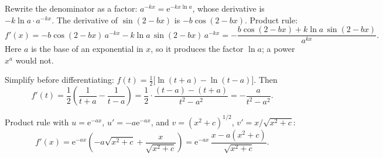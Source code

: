 \begin{solutions}
  \item Rewrite the denominator as a factor:
        $a^{-kx}=\mathrm{e}^{-kx\ln a}$, whose derivative is
        $-k\ln a\cdot a^{-kx}$. The derivative of $\sin(2-bx)$ is
        $-b\cos(2-bx)$. Product rule:
        \[
          f'(x)=-b\cos(2-bx)\,a^{-kx}-k\ln a\,\sin(2-bx)\,a^{-kx}
               =-\frac{b\cos(2-bx)+k\ln a\,\sin(2-bx)}{a^{kx}} .
        \]
        Here $a$ is the base of an exponential in $x$, so it produces the
        factor $\ln a$; a power $x^{a}$ would not.

  \item Simplify before differentiating:
        $f(t)=\tfrac12\bigl[\ln(t+a)-\ln(t-a)\bigr]$. Then
        \[
          f'(t)=\frac12\left(\frac{1}{t+a}-\frac{1}{t-a}\right)
               =\frac12\cdot\frac{(t-a)-(t+a)}{t^{2}-a^{2}}
               =-\frac{a}{t^{2}-a^{2}} .
        \]

  \item Product rule with $u=\mathrm{e}^{-ax}$, $u'=-a\mathrm{e}^{-ax}$, and
        $v=(x^{2}+c)^{1/2}$, $v'=x/\sqrt{x^{2}+c}$:
        \[
          f'(x)=\mathrm{e}^{-ax}\left(-a\sqrt{x^{2}+c}
                +\frac{x}{\sqrt{x^{2}+c}}\right)
               =\mathrm{e}^{-ax}\,\frac{x-a(x^{2}+c)}{\sqrt{x^{2}+c}} .
        \]
\end{solutions}
